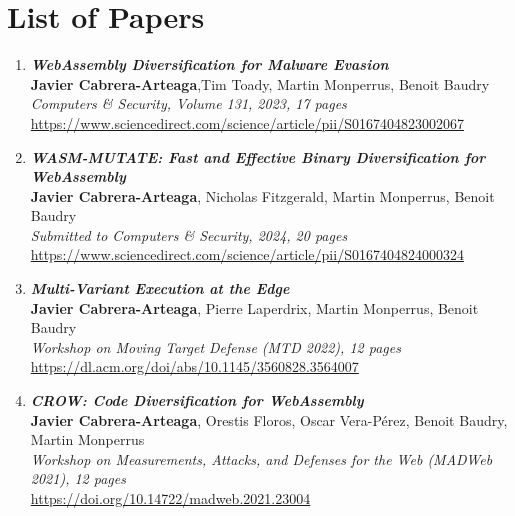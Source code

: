 
\chapter{List of Papers}

\vspace{1cm}
\begin{enumerate}[I]
    \item \textbf{\textit{WebAssembly Diversification for Malware Evasion}} \\
        \textbf{Javier Cabrera-Arteaga},Tim Toady, Martin Monperrus, Benoit Baudry\\
        \textit{Computers \& Security, Volume 131, 2023, 17 pages} \\
        \url{https://www.sciencedirect.com/science/article/pii/S0167404823002067}
    \item \textbf{\textit{WASM-MUTATE: Fast and Effective Binary Diversification for
    WebAssembly}} \\
        \textbf{Javier Cabrera-Arteaga}, Nicholas Fitzgerald, Martin Monperrus, Benoit Baudry\\
        \textit{Submitted to Computers \& Security, 2024, 20 pages} \\
        \url{https://www.sciencedirect.com/science/article/pii/S0167404824000324}    
    \item \textbf{\textit{Multi-Variant Execution at the Edge}} \\
    \textbf{Javier Cabrera-Arteaga}, Pierre Laperdrix, Martin Monperrus, Benoit Baudry\\
    \textit{Workshop on Moving Target Defense (MTD 2022), 12 pages} \\
    \url{https://dl.acm.org/doi/abs/10.1145/3560828.3564007}

    \item \textbf{\textit{CROW: Code Diversification for WebAssembly}} \\
        \textbf{Javier Cabrera-Arteaga}, Orestis Floros, Oscar Vera-Pérez, Benoit Baudry, Martin Monperrus\\
        \textit{ Workshop on Measurements, Attacks, and Defenses for the Web (MADWeb 2021), 12 pages} \\
        \url{https://doi.org/10.14722/madweb.2021.23004}
    

\end{enumerate}
